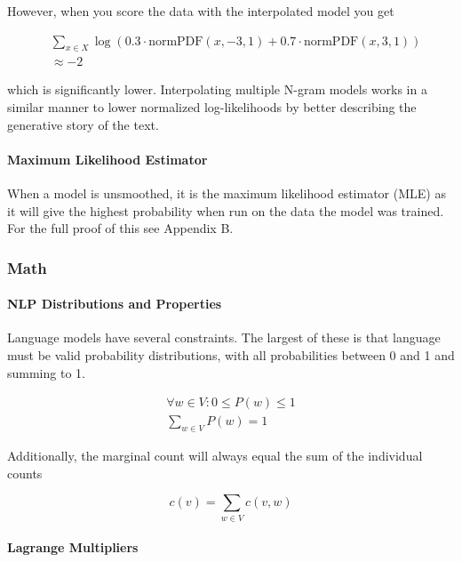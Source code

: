 \documentclass[11pt]{article}
\begin{document}
However, when you score the data with the interpolated model you get

\begin{align*}
&\sum\limits_{x \in X} \log \left( 0.3 \cdot \text{normPDF}\left(x, -3, 1\right) + 0.7 \cdot \text{normPDF}\left(x, 3, 1\right) \right) \\
&\approx -2
\end{align*}

which is significantly lower. Interpolating multiple N-gram models works in a similar manner to lower normalized log-likelihoods by better describing the generative story of the text.

\paragraph{Maximum Likelihood Estimator}

When a model is unsmoothed, it is the maximum likelihood estimator (MLE) as it will give the highest probability when run on the data the model was trained. For the full proof of this see Appendix B.

\subsubsection{Math}

\paragraph{NLP Distributions and Properties}

Language models have several constraints. The largest of these is that language must be valid probability distributions, with all probabilities between 0 and 1 and summing to 1.

\setcounter{equation}{0}

\begin{gather}
\forall w \in V : 0 \leq P\left(w\right) \leq 1 \\
\sum\limits_{w \in V} P\left(w\right) = 1
\end{gather}

Additionally, the marginal count will always equal the sum of the individual counts

$$ c\left(v\right) = \sum\limits_{w \in V} c\left(v, w\right) $$

\paragraph{Lagrange Multipliers}
\end{document}

